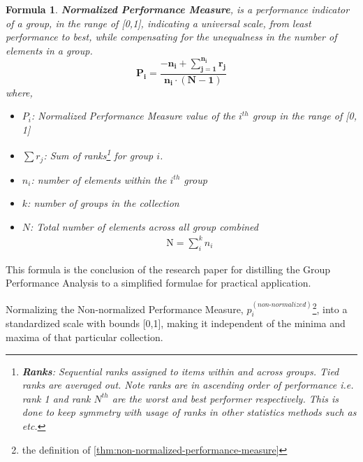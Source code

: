 \documentclass[a4paper,fleqn,review]{cas-sc}
\newtheorem{theorem}{Formula}
\begin{document}
\begin{theorem}\label{thm:normalized-performance-measure}
	\textbf{Normalized Performance Measure}, is a performance indicator of a group, in the range of [0,1], indicating a universal scale, from least performance to best, while compensating for the unequalness in the number of elements in a group.
	\begin{equation}
		\boxed{
			\mathbf{
				P_i = \frac{-n_i +  \sum\limits_{j=1}^{n_i} r_j}{n_i \cdot (N - 1)}}
		}
	\label{eq:normalized-performance-measure}	
	\end{equation}
where,
	\begin{itemize}
		\item[] \textbf{$P_i$}: Normalized Performance Measure value of the $i^{th}$ group in the range of [0, 1]
		\item[] \textbf{$\sum r_j$}: Sum of ranks\footnote{{\textbf{Ranks}: Sequential ranks assigned to items within and across groups. Tied ranks are averaged out. Note ranks are in ascending order of performance i.e. rank 1 and rank $N^{th}$ are the worst and best performer respectively. This is done to keep symmetry with usage of ranks in other statistics methods such as \cite{mann1947test} etc.}} for group $i$.
		\item[] \textbf{$n_i$}: number of elements within the $i^{th}$ group
		\item[] \textbf{$k$}: number of groups in the collection
		\item[] \textbf{$N$}: Total number of elements across all group combined
		\begin{align*}
			\text{N} = \sum\limits_i^k n_i
		\end{align*}
	\end{itemize}
\end{theorem}

This formula is the conclusion of the research paper for distilling the Group Performance Analysis to a simplified formulae for practical application.

\begin{pot}[\ref{thm:normalized-performance-measure}]
	Normalizing the Non-normalized Performance Measure, $p_i^{(non\text{-}normalized)}$\footnote{the definition of \autoref{thm:non-normalized-performance-measure}}, into a standardized scale with bounds [0,1], making it independent of the minima and maxima of that particular collection.
\end{pot}
\end{document}
